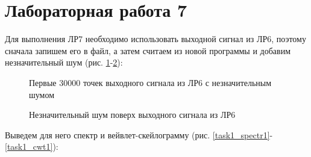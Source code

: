 \documentclass[a4paper,oneside,14pt]{extreport}
\begin{document}


\chapter*{Лабораторная работа 7}


Для выполнения ЛР7 необходимо использовать выходной сигнал из ЛР6, поэтому сначала запишем его в файл, а затем считаем из новой программы и добавим незначительный шум (рис. \ref{task1_mn}-\ref{task1_mn2}):

\begin{figure}[!h]
	\caption{Первые 30000 точек выходного сигнала из ЛР6 с незначительным шумом}
	\label{task1_mn}
\end{figure}

\begin{figure}[!h]
\caption{Незначительный шум поверх выходного сигнала из ЛР6}
\label{task1_mn2}
\end{figure}

\newpage
Выведем для него спектр и вейвлет-скейлограмму (рис. \ref{task1_spectr1}-\ref{task1_cwt1}):
\end{document}
